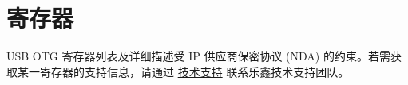 \documentclass[main\_\_CN.tex]{subfiles}
\begin{document}
\section{寄存器}

USB OTG 寄存器列表及详细描述受 IP 供应商保密协议 (NDA) 的约束。若需获取某一寄存器的支持信息，请通过 \href{https://www.espressif.com/zh-hans/contact-us/technical-inquiries}{技术支持} 联系乐鑫技术支持团队。
\end{document}
